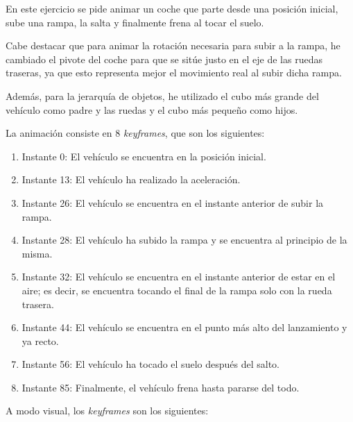 \documentclass{article}
\begin{document}
{%

En este ejercicio se pide animar un coche que parte desde una posición inicial, sube una rampa, la salta y finalmente frena al tocar el suelo.


Cabe destacar que para animar la rotación necesaria para subir a la rampa, he cambiado el pivote del coche para que se sitúe justo en el eje de las ruedas traseras, ya que esto representa mejor el movimiento real al subir dicha rampa.

Además, para la jerarquía de objetos, he utilizado el cubo más grande del vehículo como padre y las ruedas y el cubo más pequeño como hijos.
}


La animación consiste en 8 \textit{keyframes}, que son los siguientes:

\begin{enumerate}
    \item Instante 0: El vehículo se encuentra en la posición inicial.
    \item Instante 13: El vehículo ha realizado la aceleración.
    \item Instante 26: El vehículo se encuentra en el instante anterior de subir la rampa.
    \item Instante 28: El vehículo ha subido la rampa y se encuentra al principio de la misma.
    \item Instante 32: El vehículo se encuentra en el instante anterior de estar en el aire; es decir, se encuentra tocando el final de la rampa solo con la rueda trasera.
    \item Instante 44: El vehículo se encuentra en el punto más alto del lanzamiento y ya recto.
    \item Instante 56: El vehículo ha tocado el suelo después del salto.
    \item Instante 85: Finalmente, el vehículo frena hasta pararse del todo.
\end{enumerate}

A modo visual, los \textit{keyframes} son los siguientes:
\end{document}
